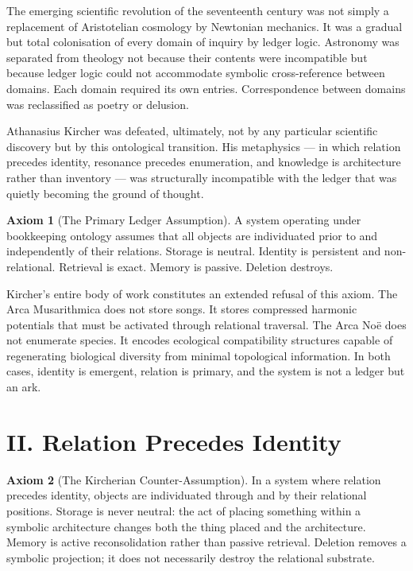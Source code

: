 \documentclass[12pt, a4paper, twoside]{memoir}
\theoremstyle{definition}
\newtheorem{axiom}{Axiom}[chapter]
\theoremstyle{remark}
\begin{document}
The emerging scientific revolution of the seventeenth century was not simply a replacement of Aristotelian cosmology by Newtonian mechanics. It was a gradual but total colonisation of every domain of inquiry by ledger logic. Astronomy was separated from theology not because their contents were incompatible but because ledger logic could not accommodate symbolic cross-reference between domains. Each domain required its own entries. Correspondence between domains was reclassified as poetry or delusion.

Athanasius Kircher was defeated, ultimately, not by any particular scientific discovery but by this ontological transition. His metaphysics --- in which relation precedes identity, resonance precedes enumeration, and knowledge is architecture rather than inventory --- was structurally incompatible with the ledger that was quietly becoming the ground of thought.

\begin{axiom}[The Primary Ledger Assumption]
A system operating under bookkeeping ontology assumes that all objects are individuated prior to and independently of their relations. Storage is neutral. Identity is persistent and non-relational. Retrieval is exact. Memory is passive. Deletion destroys.
\end{axiom}

Kircher's entire body of work constitutes an extended refusal of this axiom. The Arca Musarithmica does not store songs. It stores compressed harmonic potentials that must be activated through relational traversal. The Arca No\"e does not enumerate species. It encodes ecological compatibility structures capable of regenerating biological diversity from minimal topological information. In both cases, identity is emergent, relation is primary, and the system is not a ledger but an ark.

\section*{II. Relation Precedes Identity}

\begin{axiom}[The Kircherian Counter-Assumption]
In a system where relation precedes identity, objects are individuated through and by their relational positions. Storage is never neutral: the act of placing something within a symbolic architecture changes both the thing placed and the architecture. Memory is active reconsolidation rather than passive retrieval. Deletion removes a symbolic projection; it does not necessarily destroy the relational substrate.
\end{axiom}
\end{document}
